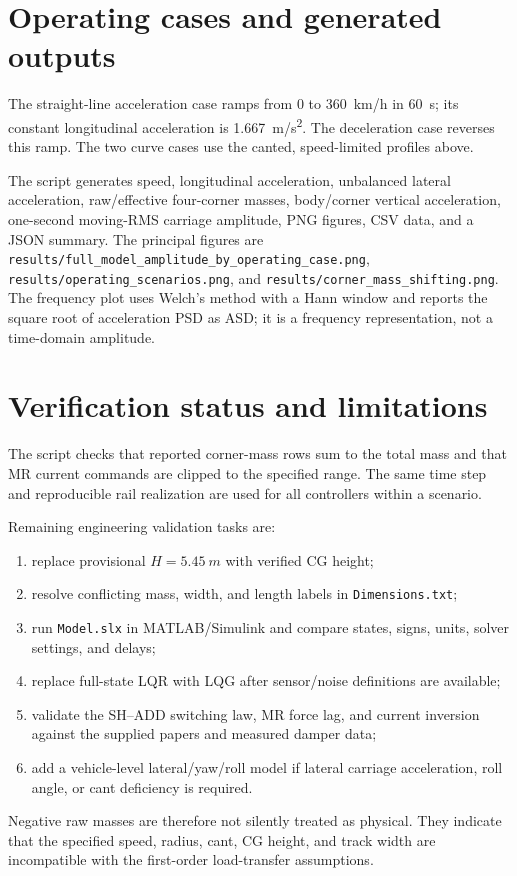 \documentclass[11pt,a4paper]{article}
\begin{document}
\section{Operating cases and generated outputs}
The straight-line acceleration case ramps from 0 to \SI{360}{km/h} in \SI{60}{s}; its constant longitudinal acceleration is \SI{1.667}{m/s^2}. The deceleration case reverses this ramp. The two curve cases use the canted, speed-limited profiles above.

The script generates speed, longitudinal acceleration, unbalanced lateral acceleration, raw/effective four-corner masses, body/corner vertical acceleration, one-second moving-RMS carriage amplitude, PNG figures, CSV data, and a JSON summary. The principal figures are \texttt{results/full\_model\_amplitude\_by\_operating\_case.png}, \texttt{results/operating\_scenarios.png}, and \texttt{results/corner\_mass\_shifting.png}. The frequency plot uses Welch's method with a Hann window and reports the square root of acceleration PSD as ASD; it is a frequency representation, not a time-domain amplitude.

\section{Verification status and limitations}
The script checks that reported corner-mass rows sum to the total mass and that MR current commands are clipped to the specified range. The same time step and reproducible rail realization are used for all controllers within a scenario.

Remaining engineering validation tasks are:
\begin{enumerate}[nosep]
\item replace provisional $H=\SI{5.45}{m}$ with verified CG height;
\item resolve conflicting mass, width, and length labels in \texttt{Dimensions.txt};
\item run \texttt{Model.slx} in MATLAB/Simulink and compare states, signs, units, solver settings, and delays;
\item replace full-state LQR with LQG after sensor/noise definitions are available;
\item validate the SH--ADD switching law, MR force lag, and current inversion against the supplied papers and measured damper data;
\item add a vehicle-level lateral/yaw/roll model if lateral carriage acceleration, roll angle, or cant deficiency is required.
\end{enumerate}

Negative raw masses are therefore not silently treated as physical. They indicate that the specified speed, radius, cant, CG height, and track width are incompatible with the first-order load-transfer assumptions.
\end{document}
